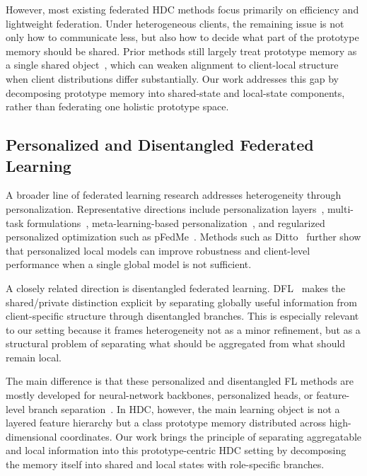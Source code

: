 \documentclass[lettersize,journal]{IEEEtran}
\newcommand{\rev}[1]{#1}
\begin{document}
However, most existing federated HDC methods focus primarily on efficiency and lightweight federation.
Under heterogeneous clients, the remaining issue is not only how to communicate less, but also how to decide what part of the prototype memory should be shared.
Prior methods still largely treat prototype memory as a single shared object~\cite{ergun2023federatedhyperdimensionalcomputing,li2024hyperfeel}, which can weaken alignment to client-local structure when client distributions differ substantially.
Our work addresses this gap by decomposing prototype memory into \rev{shared-state and local-state components}, rather than federating one holistic prototype space.

\subsection{Personalized and Disentangled Federated Learning}

A broader line of federated learning research addresses heterogeneity through personalization.
Representative directions include personalization layers~\cite{arivazhagan2019federatedlearningpersonalizationlayers}, multi-task formulations~\cite{smith2018federatedmultitasklearning}, meta-learning-based personalization~\cite{fallah2020personalized}, and regularized personalized optimization such as pFedMe~\cite{dinh2022personalizedfederatedlearningmoreau}.
Methods such as Ditto~\cite{li2021dittofairrobustfederated} further show that personalized local models can improve robustness and client-level performance when a single global model is not sufficient.

A closely related direction is disentangled federated learning.
DFL~\cite{luo2022disentangledfederatedlearningtackling} makes the shared/private distinction explicit by separating globally useful information from client-specific structure through disentangled branches.
This is especially relevant to our setting because it frames heterogeneity not as a minor refinement, but as a structural problem of separating what should be aggregated from what should remain local.

The main difference is that these personalized and disentangled FL methods are mostly developed for neural-network backbones, personalized heads, or feature-level branch separation~\cite{li2021dittofairrobustfederated,dinh2022personalizedfederatedlearningmoreau,luo2022disentangledfederatedlearningtackling}.
In HDC, however, the main learning object is not a layered feature hierarchy but a class prototype memory distributed across high-dimensional coordinates.
Our work brings the \rev{principle of separating aggregatable and local information} into this prototype-centric HDC setting by decomposing the memory itself into \rev{shared and local states with role-specific branches}.
\end{document}
